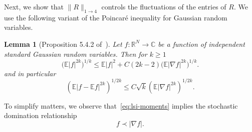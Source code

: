 \documentclass[11pt]{amsart}
\def\Real{{\mathbb R}}
\def\bbC{{\mathbb C}}
\def\Expec{{\mathbb E}}
\newcommand{\ldom}{\prec}
\numberwithin{equation}{section}
\numberwithin{theorem}{section}
\newtheorem{lemma}[theorem]{Lemma}
\begin{document}
Next, we show that $\|R\|_{1\to 4}$ controls the fluctuations of the entries of $R$.
We use the following variant of the Poincar{\'e} inequality for Gaussian random
variables.
\begin{lemma}[Proposition 5.4.2 of~\cite{bakry2014analysis}]
\label{lem:lsi-poincare}
Let $f:\Real^N\to\bbC$ be a function of independent standard Gaussian random variables.  Then
for $k\geq 1$
\begin{equation}
\label{eq:lsi-poincare}
\Big(\Expec |f|^{2k}\Big)^{1/k} \leq \Expec |f|^2
+ C(2k-2)\Big(\Expec |\nabla f|^{2k}\Big)^{1/k}.
\end{equation}
and in particular
\begin{equation}
\label{eq:lsi-moments}
(\Expec |f-\mathbb{E}f|^{2k})^{1/2k} \leq C \sqrt{k} (\Expec |\nabla f|^{2k})^{1/2k}.
\end{equation}
\end{lemma}
To simplify matters, we observe that~\eqref{eq:lsi-moments} implies the
stochastic domination relationship
\[
f \ldom |\nabla f|.
\]
\end{document}
